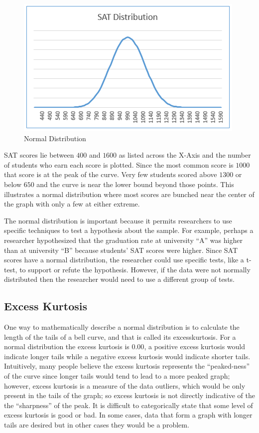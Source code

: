 \begin{figure}[H]
	\centering
	\includegraphics[width=\maxwidth{.95\linewidth}]{gfx/06-SATDistro}
	\caption{Normal Distribution}
	\label{fig06.01}
\end{figure}

SAT scores lie between $ 400 $ and $ 1600 $ as listed across the X-Axis and the number of students who earn each score is plotted. Since the most common score is $ 1000 $ that score is at the peak of the curve. Very few students scored above $ 1300 $ or below $ 650 $ and the curve is near the lower bound beyond those points. This illustrates a normal distribution where most scores are bunched near the center of the graph with only a few at either extreme.

The normal distribution is important because it permits researchers to use specific techniques to test a hypothesis about the sample. For example, perhaps a researcher hypothesized that the graduation rate at university ``A'' was higher than at university ``B'' because students' SAT scores were higher. Since SAT scores have a normal distribution, the researcher could use specific tests, like a t-test, to support or refute the hypothesis. However, if the data were not normally distributed then the researcher would need to use a different group of tests.

\subsection{Excess Kurtosis}
One way to mathematically describe a normal distribution is to calculate the length of the tails of a bell curve, and that is called its \gls{excesskurtosis}. For a normal distribution the excess kurtosis is $ 0.00 $, a positive excess kurtosis would indicate longer tails while a negative excess kurtosis would indicate shorter tails. Intuitively, many people believe the excess kurtosis represents the ``peaked-ness'' of the curve since longer tails would tend to lead to a more peaked graph; however, excess kurtosis is a measure of the data outliers, which would be only present in the tails of the graph; so excess kurtosis is not directly indicative of the the ``sharpness'' of the peak. It is difficult to categorically state that some level of excess kurtosis is good or bad. In some cases, data that form a graph with longer tails are desired but in other cases they would be a problem.

